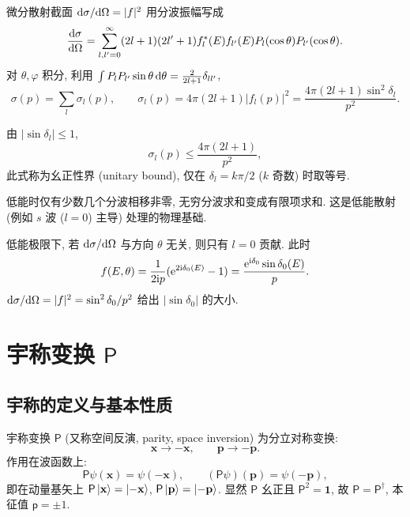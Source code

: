 微分散射截面 $\mathrm{d}\sigma/\mathrm{d}\Omega=|f|^2$ 用分波振幅写成
\begin{equation}
\frac{\mathrm{d}\sigma}{\mathrm{d}\Omega}=\sum_{l,l'=0}^{\infty}(2l+1)(2l'+1)f_l^*(E)f_{l'}(E)P_l(\cos\theta)P_{l'}(\cos\theta).
\end{equation}
对 $\theta,\varphi$ 积分, 利用 $\int P_l P_{l'}\sin\theta\,\mathrm{d}\theta=\frac{2}{2l+1}\delta_{ll'}$,
\begin{equation}
\sigma(p)=\sum_l\sigma_l(p),\qquad \sigma_l(p)=4\pi(2l+1)|f_l(p)|^2=\frac{4\pi(2l+1)\sin^2\delta_l}{p^2}.
\end{equation}

由 $|\sin\delta_l|\le 1$,
\begin{equation}\label{eq:unitarity-bound}
\sigma_l(p)\le \frac{4\pi(2l+1)}{p^2},
\end{equation}
此式称为幺正性界 (unitary bound), 仅在 $\delta_l=k\pi/2$ ($k$ 奇数) 时取等号.

\begin{remark}
低能时仅有少数几个分波相移非零, 无穷分波求和变成有限项求和. 这是低能散射 (例如 $s$ 波 ($l=0$) 主导) 处理的物理基础.
\end{remark}

\begin{example}[$s$ 波散射]
低能极限下, 若 $\mathrm{d}\sigma/\mathrm{d}\Omega$ 与方向 $\theta$ 无关, 则只有 $l=0$ 贡献. 此时
\begin{equation}
f(E,\theta)=\frac{1}{2\mathrm{i} p}(\mathrm{e}^{2\mathrm{i}\delta_0(E)}-1)=\frac{\mathrm{e}^{\mathrm{i} \delta_0}\sin\delta_0(E)}{p}.
\end{equation}
$\mathrm{d}\sigma/\mathrm{d}\Omega=|f|^2=\sin^2\delta_0/p^2$ 给出 $|\sin\delta_0|$ 的大小.
\end{example}


\section{宇称变换 \texorpdfstring{$\mathsf{P}$}{P}}\label{sec:parity}

\subsection{宇称的定义与基本性质}

宇称变换 $\mathsf{P}$ (又称空间反演, parity, space inversion) 为分立对称变换:
\begin{equation}
\mathbf{x}\to -\mathbf{x},\qquad \mathbf{p}\to -\mathbf{p}.
\end{equation}
作用在波函数上:
\begin{equation}
\mathsf{P}\psi(\mathbf{x})=\psi(-\mathbf{x}),\qquad (\mathsf{P}\psi)(\mathbf{p})=\psi(-\mathbf{p}),
\end{equation}
即在动量基矢上 $\mathsf{P}\ket{\mathbf{x}}=\ket{-\mathbf{x}}$, $\mathsf{P}\ket{\mathbf{p}}=\ket{-\mathbf{p}}$. 显然 $\mathsf{P}$ 幺正且 $\mathsf{P}^2=\mathbf{1}$, 故 $\mathsf{P}=\mathsf{P}^\dagger$, 本征值 $\mathsf{p}=\pm 1$.

